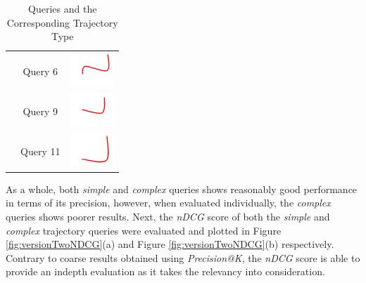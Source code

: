 \begin{table}[!ht]
\begin{tabular}{|c|c|c|}
 & Query 6 & \includegraphics{image/minimaps/query_06.png} \\ \cline{2-3}
 & Query 9 & \includegraphics{image/minimaps/query_09.png} \\ \cline{2-3}
 & Query 11 & \includegraphics{image/minimaps/query_11.png} \\ \hline
\end{tabular}
\caption{Queries and the Corresponding Trajectory Type}
\label{table:versionTwoComplexSimple}
\end{table}

As a whole, both \textit{simple} and \textit{complex} queries shows reasonably
good performance in terms of its precision, however, when evaluated
individually, the \textit{complex} queries shows poorer results. Next, the
\textit{nDCG} score of both the \textit{simple} and \textit{complex} trajectory
queries were evaluated and plotted in Figure \ref{fig:versionTwoNDCG}(a) and
Figure \ref{fig:versionTwoNDCG}(b) respectively. Contrary to coarse results
obtained using \textit{Precision@K}, the \textit{nDCG} score is able to provide
an indepth evaluation as it takes the relevancy into consideration.


